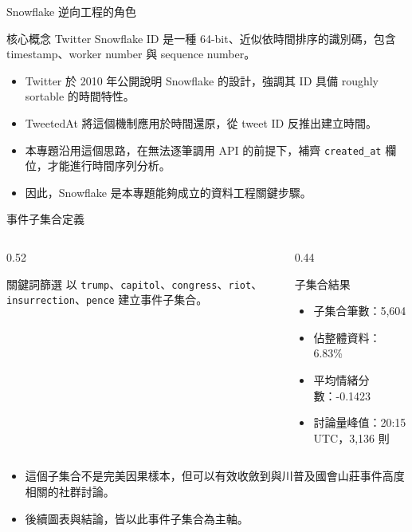 \documentclass[aspectratio=169]{ctexbeamer}
\begin{document}
\begin{frame}{Snowflake 逆向工程的角色}
\begin{block}{核心概念}
Twitter Snowflake ID 是一種 64-bit、近似依時間排序的識別碼，包含 timestamp、worker number 與 sequence number。
\end{block}

\vspace{0.5em}
\begin{itemize}
  \item Twitter 於 2010 年公開說明 Snowflake 的設計，強調其 ID 具備 roughly sortable 的時間特性。
  \item TweetedAt 將這個機制應用於時間還原，從 tweet ID 反推出建立時間。
  \item 本專題沿用這個思路，在無法逐筆調用 API 的前提下，補齊 \texttt{created\_at} 欄位，才能進行時間序列分析。
  \item 因此，Snowflake 是本專題能夠成立的資料工程關鍵步驟。
\end{itemize}
\end{frame}

\begin{frame}{事件子集合定義}
\begin{columns}[T]
  \begin{column}{0.52\textwidth}
    \begin{block}{關鍵詞篩選}
    以 \texttt{trump}、\texttt{capitol}、\texttt{congress}、\texttt{riot}、\texttt{insurrection}、\texttt{pence} 建立事件子集合。
    \end{block}
  \end{column}
  \begin{column}{0.44\textwidth}
    \begin{block}{子集合結果}
    \begin{itemize}
      \item 子集合筆數：5,604
      \item 佔整體資料：6.83\%
      \item 平均情緒分數：-0.1423
      \item 討論量峰值：20:15 UTC，3,136 則
    \end{itemize}
    \end{block}
  \end{column}
\end{columns}

\vspace{0.6em}
\begin{itemize}
  \item 這個子集合不是完美因果樣本，但可以有效收斂到與川普及國會山莊事件高度相關的社群討論。
  \item 後續圖表與結論，皆以此事件子集合為主軸。
\end{itemize}
\end{frame}
\end{document}

